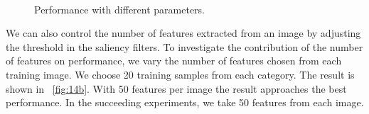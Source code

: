 \documentclass[twocolumn]{article}
\begin{document}
\begin{figure}
\centering
  \\
\caption{Performance with different parameters.}
\label{fig:14}
\end{figure}

We can also control the number of features extracted from an image by adjusting the threshold in the saliency filters. 
To investigate the contribution of the number of features on performance, we vary the number of features chosen from each training image.
We choose 20 training samples from each category.
The result is shown in \figurename~\ref{fig:14b}.
With 50 features per image the result approaches the best performance.
In the succeeding experiments, we take 50 features from each image.
\end{document}
